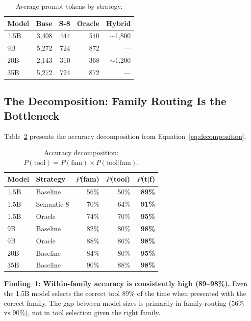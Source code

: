 \documentclass[11pt]{article}
\begin{document}
\begin{table}[h]
\centering
\caption{Average prompt tokens by strategy.}
\label{tab:tokens}
\small
\begin{tabular}{@{}lrrrr@{}}
\toprule
Model & Base & S-8 & Oracle & Hybrid \\
\midrule
1.5B & 3,408 & 444 & 540 & $\sim$1,800 \\
9B & 5,272 & 724 & 872 & --- \\
20B & 2,143 & 310 & 368 & $\sim$1,200 \\
35B & 5,272 & 724 & 872 & --- \\
\bottomrule
\end{tabular}
\end{table}

\subsection{The Decomposition: Family Routing Is the Bottleneck}

Table~\ref{tab:decomposition} presents the accuracy decomposition from Equation~\ref{eq:decomposition}.

\begin{table}[h]
\centering
\caption{Accuracy decomposition: $P(\text{tool}) = P(\text{fam}) \times P(\text{tool}|\text{fam})$.}
\label{tab:decomposition}
\small
\begin{tabular}{@{}llrrr@{}}
\toprule
Model & Strategy & $P$(fam) & $P$(tool) & $P$(t$|$f) \\
\midrule
1.5B & Baseline & 56\% & 50\% & \textbf{89\%} \\
1.5B & Semantic-8 & 70\% & 64\% & \textbf{91\%} \\
1.5B & Oracle & 74\% & 70\% & \textbf{95\%} \\
\midrule
9B & Baseline & 82\% & 80\% & \textbf{98\%} \\
9B & Oracle & 88\% & 86\% & \textbf{98\%} \\
\midrule
20B & Baseline & 84\% & 80\% & \textbf{95\%} \\
\midrule
35B & Baseline & 90\% & 88\% & \textbf{98\%} \\
\bottomrule
\end{tabular}
\end{table}

\textbf{Finding~1: Within-family accuracy is consistently high (89--98\%).} Even the 1.5B model selects the correct tool 89\% of the time when presented with the correct family. The gap between model sizes is primarily in family routing (56\% vs 90\%), not in tool selection given the right family.
\end{document}
